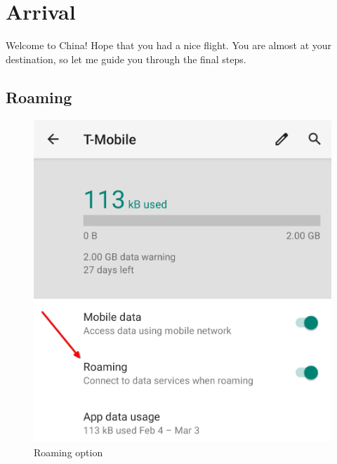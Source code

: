 

\chapter{Arrival}\label{ch:cn_arrival}
Welcome to China!
Hope that you had a nice flight.
You are almost at your destination, so let me guide you through the final steps.

\section[Roaming]{Roaming}\label{sec:cn_arrival_roaming}
\begin{figure}[H]
	\centering
	\begin{minipage}{0.45\textwidth}
		\centering
		\includegraphics[width=\linewidth]{02_china/images/01_disable_roaming}
		\caption{Roaming option}
	\end{minipage}%
	\hfill
	\begin{minipage}{0.45\textwidth}
		\centering

\end{minipage}
\end{figure}

